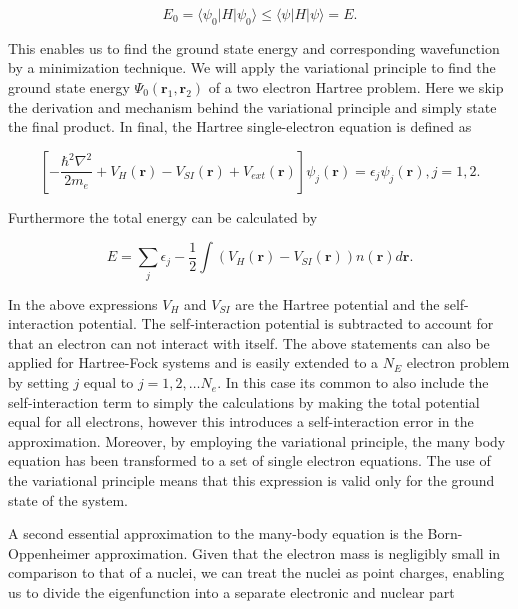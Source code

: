 \begin{equation}
    E_0 = \langle\psi_0|H|\psi_0\rangle \leq \langle\psi|H|\psi\rangle = E.
\end{equation}

This enables us to find the ground state energy and corresponding wavefunction by a minimization technique. We will apply the variational principle to find the ground state energy $\Psi_0(\boldsymbol{r}_1, \boldsymbol{r}_2)$ of a two electron Hartree problem. Here we skip the derivation and mechanism behind the variational principle and simply state the final product. In final, the Hartree single-electron equation is defined as

\begin{equation}
\left[ -\frac{\hbar^2\nabla^2}{2m_e} + V_H(\boldsymbol{r}) - V_{SI}(\boldsymbol{r}) + V_{ext}(\boldsymbol{r}) \right] \psi_j(\boldsymbol{r}) = \epsilon_j \psi_j(\boldsymbol{r}), j = 1, 2.
\end{equation}
 
Furthermore the total energy can be calculated by
 
\begin{equation}
E = \sum_j \epsilon_j - \frac{1}{2} \int \left( V_H(\boldsymbol{r}) - V_{SI}(\boldsymbol{r}) \right) n(\boldsymbol{r})d\boldsymbol{r}.
\end{equation} 
 
In the above expressions $V_H$ and $V_{SI}$ are the Hartree potential and the self-interaction potential. The self-interaction potential is subtracted to account for that an electron can not interact with itself. The above statements can also be applied for Hartree-Fock systems and is easily extended to a $N_E$ electron problem by setting $j$ equal to $j = 1, 2, \dots N_e$. In this case its common to also include the self-interaction term to simply the calculations by making the total potential equal for all electrons, however this introduces a self-interaction error in the approximation. Moreover, by employing the variational principle, the many body equation has been transformed to a set of single electron equations. The use of the variational principle means that this expression is valid only for the ground state of the system. 

A second essential approximation to the many-body equation is the Born-Oppenheimer approximation. Given that the electron mass is negligibly small in comparison to that of a nuclei, we can treat the nuclei as point charges, enabling us to divide the eigenfunction into a separate electronic and nuclear part

